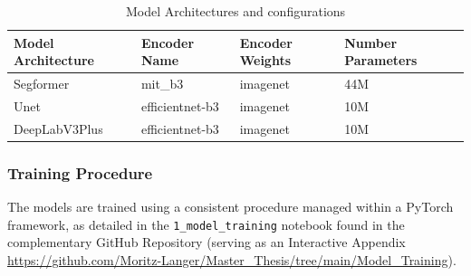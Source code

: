 \documentclass{report}
\begin{document}
\begin{table}[H]
\centering
\caption{Model Architectures and configurations}
\label{tab:model_architectures}
\begin{tabular}{llll}
\toprule
Model Architecture & Encoder Name & Encoder Weights & Number Parameters \\
\midrule
Segformer & mit\_b3 & imagenet & 44M \\
Unet & efficientnet-b3 & imagenet & 10M \\
DeepLabV3Plus & efficientnet-b3 & imagenet & 10M \\
\bottomrule
\end{tabular}

\end{table}

\subsubsection{Training Procedure}
\label{sec:training_procedure}
The models are trained using a consistent procedure managed within a PyTorch framework, as detailed in the \texttt{1\_model\_training} notebook found in the complementary GitHub Repository (serving as an Interactive Appendix \url{https://github.com/Moritz-Langer/Master_Thesis/tree/main/Model_Training}).
\end{document}
